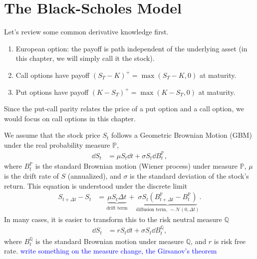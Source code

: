 \documentclass{book}
\begin{document}
\fi

\chapter{The Black-Scholes Model}
Let's review some common derivative knowledge first. 
\begin{enumerate}
    \item European option: the payoff is path independent of the underlying asset (in this chapter, we will simply call it the stock).
    \item Call options have payoff $(S_T-K)^+ = \max(S_T-K,0)$ at maturity.
    \item Put options have payoff $(K-S_T)^+ = \max(K-S_T,0)$ at maturity.
\end{enumerate}
Since the put-call parity relates the price of a put option and a call option, we would focus on call options in this chapter.

We assume that the stock price $S_t$ follows a Geometric Brownian Motion (GBM) under the real probability measure $\mathbb{P}$, 
\begin{align}
    \dd S_t &= \mu S_t \dd t +\sigma S_t \dd B_t^\mathbb{P},
    \label{eqn:BSM:stock-GBM-P}
\end{align}
where $B_t^\mathbb{P}$ is the standard Brownian motion (Wiener process) under measure $\mathbb{P}$, $\mu$ is the drift rate of $S$ (annualized), and $\sigma$ is the standard deviation of the stock's return. This equation is understood under the discrete limit
\begin{align}
    S_{t+\Delta t} -S_t &= \underbrace{\mu S_t \Delta t}_{\text{drift term}} + \underbrace{\sigma S_t (B_{t+\Delta t}^\mathbb{P} - B_{t}^\mathbb{P})}_{\text{diffusion term, } \sim \mathcal{N}(0,\Delta t)}.
    \label{eqn:BSM:stock-GBM-Q-discrete}
\end{align}
In many cases, it is easier to transform this to the risk neutral measure $\mathbb{Q}$
\begin{align}
    \dd S_t &= r S_t \dd t +\sigma S_t \dd B_t^\mathbb{Q},
    \label{eqn:BSM:stock-GBM-Q}
\end{align}
where $B_t^\mathbb{Q}$ is the standard Brownian motion under measure $\mathbb{Q}$, and $r$ is risk free rate. \textcolor{blue}{write something on the measure change, the Girsanov’s theorem}
\end{document}
